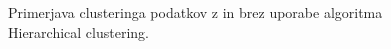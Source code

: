 \documentclass[a4paper]{article}
\begin{document}
	\begin{figure}[H]
	\begin{center}
	\end{center}
	\caption{Primerjava clusteringa podatkov z in brez uporabe algoritma Hierarchical clustering.}
	\label{clus-hier}
	\end{figure}
	
\end{document}
